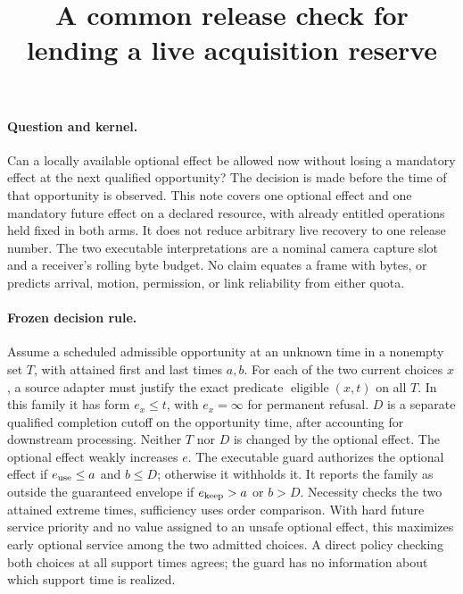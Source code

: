\documentclass{article}
\begin{document}
\title{A common release check for lending a live acquisition reserve}
\maketitle

\paragraph{Question and kernel.}
Can a locally available optional effect be allowed now without losing
a mandatory effect at the next qualified opportunity? The decision is
made before the time of that opportunity is observed. This note covers
one optional effect and one mandatory future effect on a declared
resource, with already entitled operations held fixed in both arms.
It does not reduce arbitrary live recovery to one release number.
The two executable interpretations are a nominal camera capture slot
and a receiver's rolling byte budget. No claim equates a frame with
bytes, or predicts arrival, motion, permission, or link reliability
from either quota.

\paragraph{Frozen decision rule.}
Assume a scheduled admissible opportunity at an unknown time in a
nonempty set \(T\), with attained first and last times \(a,b\).
For each of the two current choices \(x\), a source adapter must
justify the exact predicate \(\operatorname{eligible}(x,t)\)
on all \(T\). In this family it has form \(e_x\leq t\),
with \(e_x=\infty\) for permanent refusal. \(D\) is a separate
qualified completion cutoff on the opportunity time, after accounting
for downstream processing. Neither \(T\) nor \(D\) is changed by
the optional effect. The optional effect weakly increases \(e\).
The executable guard authorizes the optional effect if
\(e_{\rm use}\leq a\) and \(b\leq D\); otherwise it withholds it.
It reports the family as outside the guaranteed envelope if
\(e_{\rm keep}> a\) or \(b>D\).
Necessity checks the two attained extreme times, sufficiency
uses order comparison. With hard future service priority and no
value assigned to an unsafe optional effect, this maximizes early
optional service among the two admitted choices. A direct policy
checking both choices at all support times agrees; the guard
has no information about which support time is realized.
\end{document}
